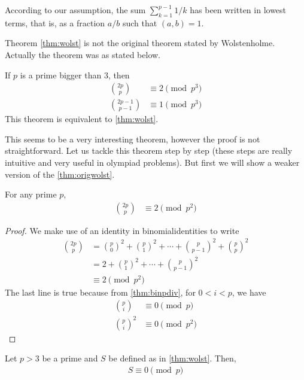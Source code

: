 \documentclass[12pt]{subfile}
\begin{document}
		\begin{note}
			According to our assumption, the sum $ \sum_{k=1}^{p-1} 1/k$ has been written in lowest terms, that is, as a fraction $a/b$ such that $(a,b)=1$.
		\end{note}

		\begin{remark}
			Theorem \eqref{thm:wolst} is not the original theorem stated by Wolstenholme. Actually the theorem was as stated below.
		\end{remark}

		\begin{theorem}\label{thm:origwolst}
			If $p$ is a prime bigger than $3$, then
			\begin{align*}
				\binom{2p}{p} & \equiv2\pmod{p^3}\\
				\binom{2p-1}{p-1} & \equiv 1 \pmod{p^3}
			\end{align*}
			This theorem is equivalent to \autoref{thm:wolst}.
		\end{theorem}
	This seems to be a very interesting theorem, however the proof is not straightforward. Let us tackle this theorem step by step (these steps are really intuitive and very useful in olympiad problems). But first we will show a weaker version of the \autoref{thm:origwolst}.
		\begin{theorem}
			For any prime $p$,
				\begin{align*}
					\binom{2p}{p} & \equiv2\pmod{p^2}
				\end{align*}
		\end{theorem}

		\begin{proof}
			We make use of an identity in \gls{binomialidentities} to write
				\begin{align*}
					\binom{2p}p & = \binom{p}0^2+\binom{p}{1}^2+\cdots+\binom{p}{p-1}^2+\binom{p}{p}^2\\
								& = 2+\binom{p}{1}^2+\cdots+\binom{p}{p-1}^2\\
								& \equiv2\pmod{p^2}
				\end{align*}
			The last line is true because from \autoref{thm:binpdiv}, for $0<i<p$, we have
				\begin{align*}
					\binom{p}{i}
						& \equiv 0\pmod p\\
					\binom{p}{i}^2
						& \equiv 0\pmod{p^2}
				\end{align*}
		\end{proof}

		\begin{lemma}\label{lem:wolstproof1}
			Let $p>3$ be a prime and $S$ be defined as in \autoref{thm:wolst}. Then,
				\begin{align*}
					S \equiv 0 \pmod p
				\end{align*}
		\end{lemma}
\end{document}
